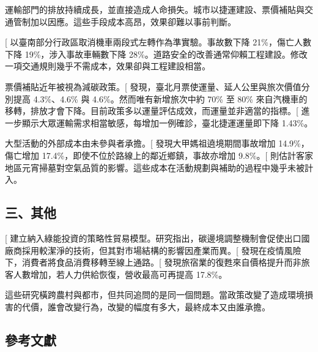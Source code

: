 \documentclass[
  11pt,
]{article}
\begin{document}
運輸部門的排放持續成長，並直接造成人命損失。城市以捷運建設、票價補貼與交通管制加以因應。這些手段成本高昂，效果卻難以事前判斷。

{[}\citeproc{ref-liou2026hookturn}{6}{]}
以臺南部分行政區取消機車兩段式左轉作為準實驗。事故數下降
21\%，傷亡人數下降 19\%，涉入事故車輛數下降
28\%。道路安全的改善通常仰賴工程建設。修改一項交通規則幾乎不需成本，效果卻與工程建設相當。

票價補貼近年被視為減碳政策。{[}\citeproc{ref-liou2025monthly}{7}{]}
發現，臺北月票使運量、延人公里與旅次價值分別提高 4.3\%、4.6\% 與
4.6\%。然而唯有新增旅次中約 70\% 至 80\%
來自汽機車的移轉，排放才會下降。目前政策多以運量評估成效，而運量並非適當的指標。{[}\citeproc{ref-chang2021metro}{8}{]}
進一步顯示大眾運輸需求相當敏感，每增加一例確診，臺北捷運運量即下降
1.43\%。

大型活動的外部成本由未參與者承擔。{[}\citeproc{ref-liou2026religious}{9}{]}
發現大甲媽祖遶境期間事故增加 14.9\%，傷亡增加
17.4\%，即使不位於路線上的鄰近鄉鎮，事故亦增加
9.8\%。{[}\citeproc{ref-chang2024air}{10}{]}
則估計客家地區元宵掃墓對空氣品質的影響。這些成本在活動規劃與補助的過程中幾乎未被計入。

\subsection{三、其他}\label{ux4e09ux5176ux4ed6}

{[}\citeproc{ref-liou2025cbam}{11}{]}
建立納入綠能投資的策略性貿易模型。研究指出，碳邊境調整機制會促使出口國廠商採用較潔淨的技術，但其對市場結構的影響因產業而異。{[}\citeproc{ref-liou2024covid}{12}{]}
發現在疫情風險下，消費者將食品消費移轉至線上通路。{[}\citeproc{ref-liou2026hotel}{13}{]}
發現旅宿業的復甦來自價格提升而非旅客人數增加，若人力供給恢復，營收最高可再提高
17.8\%。

這些研究橫跨農村與都市，但共同追問的是同一個問題。當政策改變了造成環境損害的代價，誰會改變行為，改變的幅度有多大，最終成本又由誰承擔。

\newpage

\subsection*{參考文獻}\label{ux53c3ux8003ux6587ux737b}
\end{document}
